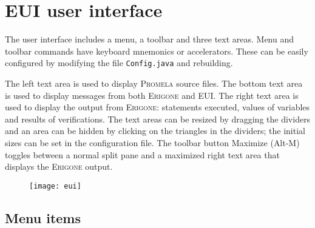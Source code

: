 \documentclass[11pt]{article}
\newcommand{\eri}{\textsc{Erigone}}
\newcommand{\prm}{\textsc{Promela}}
\newcommand{\eui}{\textsc{EUI}}
\newcommand{\p}[1]{\texttt{#1}}
\newcommand{\bu}[1]{\textsf{#1}}
\begin{document}
\section{\eui{} user interface}
The user interface includes a menu, a toolbar and three text areas.
Menu and toolbar commands have keyboard mnemonics or accelerators.
These can be easily configured by modifying the file \p{Config.java} and
rebuilding.

The left text area is used to display \prm{} source files. The bottom
text area is used to display messages from both \eri{} and \eui{}. The
right text area is used to display the output from \eri{}: statements
executed, values of variables and results of verifications. The text
areas can be resized by dragging the dividers and an area can be hidden
by clicking on the triangles in the dividers; the initial sizes can be
set in the configuration file. The toolbar button \bu{Maximize}
(\bu{Alt-M}) toggles between a normal split pane and a maximized right
text area that displays the \eri{} output.

\begin{figure}[tb]
\begin{center}
\texttt{[image: eui]}
\end{center}
\end{figure}

\subsection{Menu items}
\end{document}
